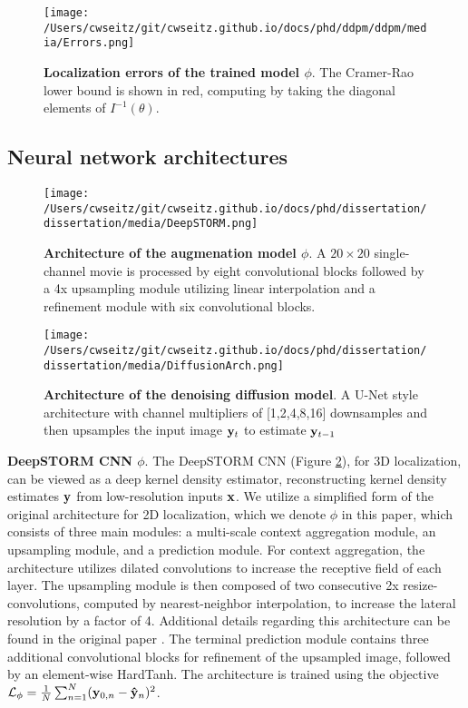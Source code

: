 \begin{figure}[t]
\centering
\texttt{[image: /Users/cwseitz/git/cwseitz.github.io/docs/phd/ddpm/ddpm/media/Errors.png]}
\caption{\textbf{Localization errors of the trained model $\phi$}. The Cramer-Rao lower bound is shown in red, computing by taking the diagonal elements of $I^{-1}(\theta)$.}
\label{fig:fig15}
\end{figure}


\subsection{Neural network architectures}

\begin{figure}[t]
\centering
\texttt{[image: /Users/cwseitz/git/cwseitz.github.io/docs/phd/dissertation/dissertation/media/DeepSTORM.png]}
\caption{\textbf{Architecture of the augmenation model $\phi$}. A $20\times 20$ single-channel movie is processed by eight convolutional blocks followed by a 4x upsampling module utilizing linear interpolation and a refinement module with six convolutional blocks.}
\label{fig:fig13}
\end{figure}


\begin{figure}[t]
\centering
\texttt{[image: /Users/cwseitz/git/cwseitz.github.io/docs/phd/dissertation/dissertation/media/DiffusionArch.png]}
\caption{\textbf{Architecture of the denoising diffusion model}. A U-Net style architecture with channel multipliers of [1,2,4,8,16] downsamples and then upsamples the input image $\bold{y}_{t}$ to estimate $\bold{y}_{t-1}$}
\label{fig:fig14}
\end{figure}

\textbf{DeepSTORM CNN $\phi$}. The DeepSTORM CNN (Figure \ref{fig:fig13}), for 3D localization, can be viewed as a deep kernel density estimator, reconstructing kernel density estimates $\bold{y}$ from low-resolution inputs $\bold{x}$. We utilize a simplified form of the original architecture \parencite{Nehme2020} for 2D localization, which we denote $\phi$ in this paper, which consists of three main modules: a multi-scale context aggregation module, an upsampling module, and a prediction module. For context aggregation, the architecture utilizes dilated convolutions to increase the receptive field of each layer. The upsampling module is then composed of two consecutive 2x resize-convolutions, computed by nearest-neighbor interpolation, to increase the lateral resolution by a factor of 4. Additional details regarding this architecture can be found in the original paper \cite{Nehme2020}. The terminal prediction module contains three additional convolutional blocks for refinement of the upsampled image, followed by an element-wise HardTanh. The architecture is trained using the objective $\mathcal{L}_{\phi} = \frac{1}{N}\sum_{n=1}^{N} (\bold{y}_{0,n}-\bold{\hat{y}}_{n})^{2}$. 


